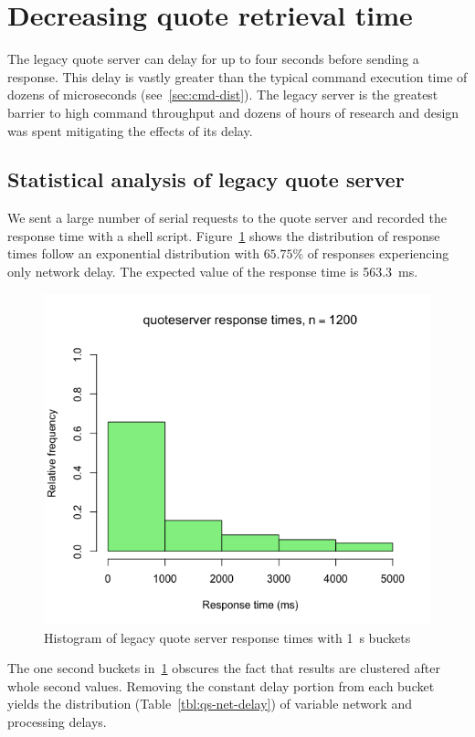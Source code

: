 \section{Decreasing quote retrieval time}\label{sec:qs}
The legacy quote server can delay for up to four seconds before sending a response.
This delay is vastly greater than the typical command execution time of dozens of microseconds (see~\ref{sec:cmd-dist}).
The legacy server is the greatest barrier to high command throughput and dozens of hours of research and design was spent mitigating the effects of its delay.

\subsection{Statistical analysis of legacy quote server}
We sent a large number of serial requests to the quote server and recorded the response time with a shell script.
Figure~\ref{fig:legacy-qs-hist} shows the distribution of response times follow an exponential distribution with $65.75\%$ of responses experiencing only network delay.
The expected value of the response time is \SI{563.3}{\milli\second}.

\begin{figure}[tbph]
  \centering
  \includegraphics[width=0.6\linewidth]{../../data/quoteserver-times/hist}
  \caption[Legacy quote server response times]{Histogram of legacy quote server response times with \SI{1}{\second} buckets}
  \label{fig:legacy-qs-hist}
\end{figure}

The one second buckets in~\ref{fig:legacy-qs-hist} obscures the fact that results are clustered after whole second values.
Removing the constant delay portion from each bucket yields the distribution (Table~\ref{tbl:qs-net-delay}) of variable network and processing delays.

